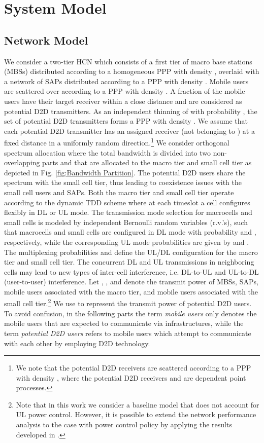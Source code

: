 \documentclass[twocolumn,english]{IEEEtran}
\theoremstyle{plain}
\theoremstyle{definition}
\begin{document}
\section{System Model}


\subsection{Network Model}

We consider a two-tier HCN which consists of a first tier of macro
base stations (MBSs) distributed according to a homogeneous PPP 
with density , overlaid with a network of SAPs
distributed according to a PPP  with density .
Mobile users are scattered over  according to a PPP
 with density . A fraction
 of the mobile users have their target receiver within a close
distance and are considered as potential D2D transmitters. As an independent
thinning of  with probability , the set
of potential D2D transmitters 
forms a PPP with density . We assume that
each potential D2D transmitter has an assigned receiver (not belonging
to ) at a fixed distance  in
a uniformly random direction.\footnote{We note that the potential D2D receivers are scattered according to
a PPP with density , where the potential
D2D receivers and  are dependent point processes.} We consider orthogonal spectrum allocation where the total bandwidth
 is divided into two non-overlapping parts  and 
that are allocated to the macro tier and small cell tier as depicted
in Fig. \ref{fig:Bandwidth Partition}. The potential D2D users share
the spectrum with the small cell tier, thus leading to coexistence
issues with the small cell users and SAPs. Both the macro tier and
small cell tier operate according to the dynamic TDD scheme where
at each timeslot a cell configures flexibly in DL or UL mode. The
transmission mode selection for macrocells and small cells is modeled
by independent Bernoulli random variables (r.v.'s), such that macrocells
and small cells are configured in DL mode with probability 
and , respectively, while the corresponding
UL mode probabilities are given by 
and . The multiplexing probabilities
 and  define
the UL/DL configuration for the macro tier and small cell tier. The
concurrent DL and UL transmissions in neighboring cells may lead to
new types of inter-cell interference, i.e. DL-to-UL and UL-to-DL (user-to-user)
interference. Let , , 
and  denote the transmit power of MBSs, SAPs, mobile
users associated with the macro tier, and mobile users associated
with the small cell tier.\footnote{Note that in this work we consider a baseline model that does not
account for UL power control. However, it is possible to extend the
network performance analysis to the case with power control policy
by applying the results developed in \cite{SSFD,AMMS,AMUC,OTCR}. } We use  to represent the transmit power of potential
D2D users. To avoid confusion, in the following parts the term \emph{mobile
users} only denotes the mobile users that are expected to communicate
via infrastructures, while the term \emph{potential D2D users }refers
to mobile users which attempt to communicate with each other by employing
D2D technology.
\end{document}
